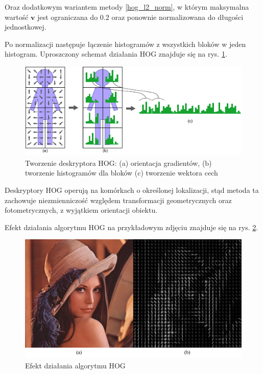 Oraz dodatkowym wariantem metody \ref{hog_l2_norm}, w którym maksymalna wartość $\boldsymbol{v}$ jest ograniczana do $0.2$ oraz ponownie normalizowana do długości jednostkowej.

Po normalizacji następuje łączenie histogramów z wszystkich bloków w jeden histogram. Uproszczony schemat działania HOG znajduje się na rys. \ref{fig:hog-process}.

\begin{figure}[h]
	\centering
	\includegraphics[scale=1.7]{graphics/01_podstawy_teoretyczne/hog-process.pdf}
	\caption{ Tworzenie deskryptora HOG: (a) orientacja gradientów, (b) tworzenie histogramów dla bloków (c) tworzenie wektora cech }
	\label{fig:hog-process}
\end{figure}

Deskryptory HOG operują na komórkach o określonej lokalizacji, stąd metoda ta zachowuje niezmienniczość względem transformacji geometrycznych oraz fotometrycznych, z wyjątkiem orientacji obiektu.\cite{DALAL05}

Efekt działania algorytmu HOG na przykładowym zdjęciu znajduje się na rys. \ref{fig:hog-features}.

\begin{figure}[h]
	\centering
	\includegraphics[scale=0.5]{graphics/01_podstawy_teoretyczne/hog-features.pdf}
	\caption{ Efekt działania algorytmu HOG }
	\label{fig:hog-features}
\end{figure}

